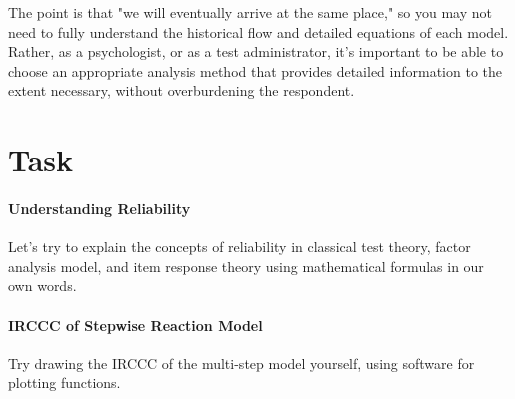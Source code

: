 \documentclass{ltjsbook}
\begin{document}
The point is that "we will eventually arrive at the same place," so you may not need to fully understand the historical flow and detailed equations of each model. Rather, as a psychologist, or as a test administrator, it's important to be able to choose an appropriate analysis method that provides detailed information to the extent necessary, without overburdening the respondent.


\section{Task}
\paragraph{Understanding Reliability} Let's try to explain the concepts of reliability in classical test theory, factor analysis model, and item response theory using mathematical formulas in our own words.
\paragraph{IRCCC of Stepwise Reaction Model} Try drawing the IRCCC of the multi-step model yourself, using software for plotting functions.
\end{document}
